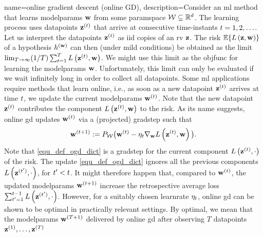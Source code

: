 {name={online gradient descent (online GD)}, 
	description={Consider  an \gls{ml} method that learns \gls{modelparams} 
		${\bf w}$ from some \gls{paramspace} $\mathcal{W} \subseteq \mathbb{R}^{d}$. 
		The learning process uses \glspl{datapoint} ${\bf z}^{(t)}$ that arrive at consecutive time-instants $t=1,2,\ldots$. 
		Let us interpret the \glspl{datapoint} ${\bf z}^{(t)}$ as \gls{iid} copies 
		of an \gls{rv} ${\bf z}$. The \gls{risk} $\mathbb{E}\{ L\left({\bf z},{\bf w} \right) \}$ of a 
		\gls{hypothesis} $h^{({\bf w})}$ can then (under mild conditions) be obtained as the limit 
		$\lim_{T\rightarrow \infty} (1/T)\sum_{t=1}^{T} L\left({\bf z}^{(t)},{\bf w} \right)$. 
		We might use this limit as the \gls{objfunc} for learning the \gls{modelparams} ${\bf w}$. 
		Unfortunately, this limit can only be evaluated if we wait infinitely long in order to collect all \glspl{datapoint}. 
		Some \gls{ml} applications require methods that learn online, i.e., as soon as a new \gls{datapoint} ${\bf z}^{(t)}$ 
		arrives at time $t$, we update the current \gls{modelparams} ${\bf w}^{(t)}$. Note that 
		the new \gls{datapoint} ${\bf z}^{(t)}$ contributes the component $L\left({\bf z}^{(t)},{\bf w} \right)$ 
		to the \gls{risk}. As its name suggests, online \gls{gd} updates ${\bf w}^{(t)}$ via a (projected) \gls{gradstep} such that
		\begin{equation} 
			\label{equ_def_ogd_dict}
 			{\bf w}^{(t+1)} := P_{\mathcal{W}}\big( {\bf w}^{(t)} - \eta_{t} \nabla_{{\bf w}} L\left({\bf z}^{(t)},{\bf w} \right)\big). 
		\end{equation} 
		Note that \eqref{equ_def_ogd_dict} is a \gls{gradstep} for the current component $L\left({\bf z}^{(t)},\cdot \right)$ 
		of the \gls{risk}. The update \eqref{equ_def_ogd_dict} ignores all the previous components $L\left({\bf z}^{(t')},\cdot \right)$, 
		for $t' < t$. It might therefore happen that, compared to ${\bf w}^{(t)}$, the updated \gls{modelparams} 
		${\bf w}^{(t+1)}$ increase the retrospective average \gls{loss} $\sum_{t'=1}^{t-1} L\left({\bf z}^{(t')},\cdot \right)$. 
		However, for a suitably chosen \gls{learnrate} $\eta_{t}$, online \gls{gd} can be shown 
		to be optimal in practically relevant settings. By optimal, we mean that the \gls{modelparams} 
		${\bf w}^{(T+1)}$ delivered by online \gls{gd} after observing $T$ \glspl{datapoint} ${\bf z}^{(1)},\ldots, {\bf z}^{(T)}$ 
}}
